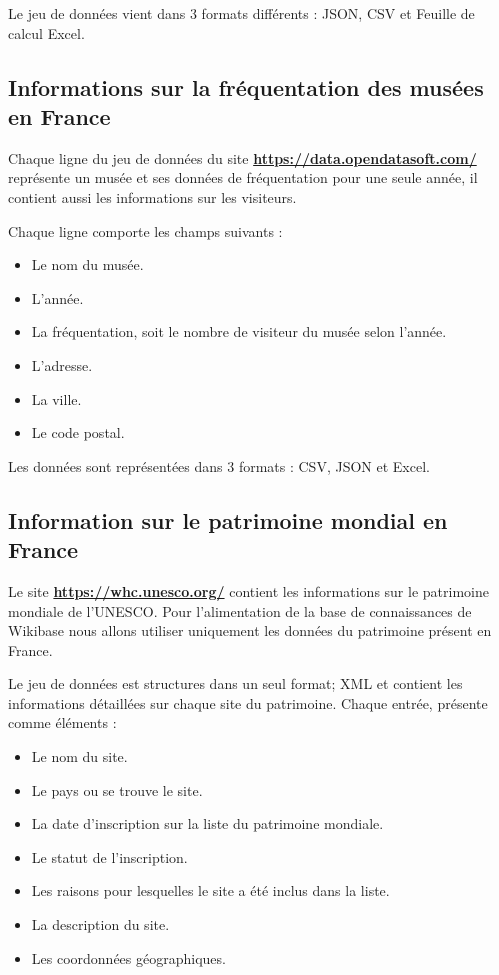 \documentclass[a4paper, 12pt]{article}
\begin{document}
Le jeu de données vient dans 3 formats différents : JSON, CSV et Feuille de calcul Excel.
 
 \subsection{Informations sur la fréquentation des musées en France}
Chaque ligne du jeu de données du site \href{https://data.opendatasoft.com/}{\textbf{https://data.opendatasoft.com/}}
représente un musée et ses données de fréquentation pour une seule année, il contient aussi les informations sur les visiteurs.

Chaque ligne comporte les champs suivants : 
\begin{itemize}
    \item Le nom du musée.
    \item L'année.
    \item La fréquentation, soit le nombre de visiteur du musée selon l'année.
    \item L'adresse.
    \item La ville.
    \item Le code postal.
\end{itemize}

Les données sont représentées dans 3 formats : CSV, JSON et Excel.
 
 \subsection{Information sur le patrimoine mondial en France}

Le site \href{https://whc.unesco.org/}{\textbf{https://whc.unesco.org/}} contient les informations sur le patrimoine mondiale de l'UNESCO. Pour l'alimentation de la base de connaissances de Wikibase nous allons utiliser uniquement les données du patrimoine présent en France.

Le jeu de données est structures dans un seul format; XML et contient les informations détaillées sur chaque site du patrimoine. Chaque entrée, présente comme éléments :

\begin{itemize}
    \item  Le nom du site.
    \item Le pays ou se trouve le site.
    \item La date d'inscription sur la liste du patrimoine mondiale.
    \item Le statut de l'inscription.
    \item Les raisons pour lesquelles le site a été inclus dans la liste.
    \item La description du site.
    \item Les coordonnées géographiques.
\end{itemize}
\end{document}
